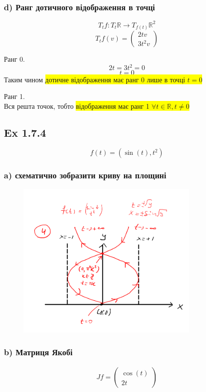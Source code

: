 \documentclass[10pt, a4paper]{article} %
\newcommand{\R}{\mathbb{R}}
\begin{document}
\subsubsection*{d) Ранг дотичного відображення в точці}
\[T_{t}f: T_{t}\R \to T_{f(t)}\R^2\]
\[T_{t}f(v) = \begin{pmatrix}
    2tv \\ 3t^2v
\end{pmatrix}\]

Ранг 0.
\[2t = 3t^2 = 0\]
\[t = 0\]
Таким чином \colorbox{yellow}{дотичне відображення має ранг 0 лише в точці $t=0$}

Ранг 1.\\
Вся решта точок, тобто \colorbox{yellow}{відображення має ранг 1 $\forall t \in \R, t\ne 0$}


\newpage
\subsection*{Ex 1.7.4}
\[f(t) = (\sin(t), t^2)\]

\subsubsection*{a) схематично зобразити криву на площині}
\begin{figure}[h]
    \includegraphics[width=0.8\textwidth]{1.7.4.png}
    \centering
\end{figure}


\subsubsection*{b) Матриця Якобі}
\begin{align*}
    Jf = \begin{pmatrix}
        \cos(t) \\ 2t
    \end{pmatrix}
\end{align*}
\end{document}
